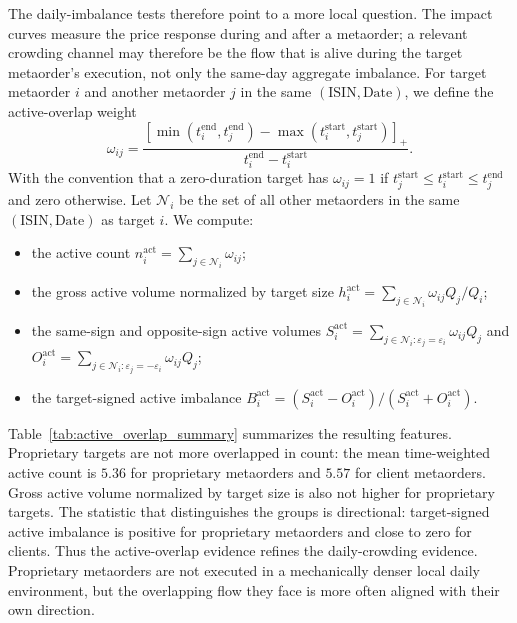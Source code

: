 \documentclass[11pt]{article}
\begin{document}
The daily-imbalance tests therefore point to a more local question. The impact
curves measure the price response during and after a metaorder; a relevant
crowding channel may therefore be the flow that is alive during the target
metaorder's execution, not only the same-day aggregate imbalance. For target
metaorder \(i\) and another metaorder \(j\) in the same \((\mathrm{ISIN},\mathrm{Date})\),
we define the active-overlap weight
\begin{equation}
  \omega_{ij}
  =
  \frac{
  \left[
  \min(t_i^{\text{end}},t_j^{\text{end}})
  -
  \max(t_i^{\text{start}},t_j^{\text{start}})
  \right]_+}
  {t_i^{\text{end}}-t_i^{\text{start}}}.
\end{equation}
With the convention that a zero-duration target has \(\omega_{ij}=1\) if
\(t_j^{\text{start}}\leq t_i^{\text{start}}\leq t_j^{\text{end}}\) and zero
otherwise. Let \(\mathcal{N}_i\) be the set of all other metaorders in the same
\((\mathrm{ISIN},\mathrm{Date})\) as target \(i\). We compute:
\begin{itemize}
  \item the active count
  \(n_i^{\mathrm{act}}=\sum_{j\in\mathcal{N}_i}\omega_{ij}\);
  \item the gross active volume normalized by target size
  \(h_i^{\mathrm{act}}=\sum_{j\in\mathcal{N}_i}\omega_{ij}Q_j/Q_i\);
  \item the same-sign and opposite-sign active volumes
  \(S_i^{\mathrm{act}}=\sum_{j\in\mathcal{N}_i:\varepsilon_j=\varepsilon_i}\omega_{ij}Q_j\)
  and
  \(O_i^{\mathrm{act}}=\sum_{j\in\mathcal{N}_i:\varepsilon_j=-\varepsilon_i}\omega_{ij}Q_j\);
  \item the target-signed active imbalance
  \(B_i^{\mathrm{act}}=(S_i^{\mathrm{act}}-O_i^{\mathrm{act}})/
  (S_i^{\mathrm{act}}+O_i^{\mathrm{act}})\).
\end{itemize}

Table~\ref{tab:active_overlap_summary} summarizes the resulting features.
Proprietary targets are not more overlapped in count: the mean time-weighted
active count is \(5.36\) for proprietary metaorders and \(5.57\) for client
metaorders. Gross active volume normalized by target size is also not higher for
proprietary targets. The statistic that distinguishes the groups is directional:
target-signed active imbalance is positive for proprietary metaorders and close
to zero for clients. Thus the active-overlap evidence refines the daily-crowding
evidence. Proprietary metaorders are not executed in a mechanically denser local
daily environment, but the overlapping flow they face is more often aligned with
their own direction.
\end{document}
